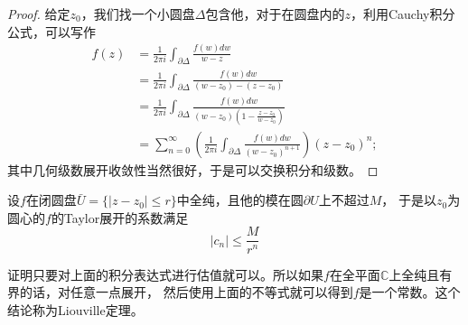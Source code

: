 \begin{proof}
给定$z_0$，我们找一个小圆盘$\Delta$包含他，对于在圆盘内的$z$，利用Cauchy积分公式，可以写作
\[
    \begin{aligned}
        f(z) & =\frac{1}{2 \pi i} \int_{\partial \Delta} \frac{f(w) d w}{w-z} \\
        & =\frac{1}{2 \pi i} \int_{\partial \Delta} \frac{f(w) d w}{\left(w-z_0\right)-\left(z-z_0\right)} \\
        & =\frac{1}{2 \pi i} \int_{\partial \Delta} \frac{f(w) d w}{\left(w-z_0\right)\left(1-\frac{z-z_0}{w-z_0}\right)} \\
        & =\sum_{n=0}^{\infty}\left(\frac{1}{2 \pi i} \int_{\partial \Delta} \frac{f(w) d w}{\left(w-z_0\right)^{n+1}}\right)\left(z-z_0\right)^n ;
    \end{aligned}
\]
其中几何级数展开收敛性当然很好，于是可以交换积分和级数。
\end{proof}

\begin{pro}[Cauchy不等式]
    设$f$在闭圆盘$\bar{U}=\{|z-z_0|\leq r\}$中全纯，且他的模在圆$\partial U$上不超过$M$，
    于是以$z_0$为圆心的$f$的Taylor展开的系数满足
	\[|c_n|\leq \frac{M}{r^n}\]
\end{pro}
证明只要对上面的积分表达式进行估值就可以。所以如果$f$在全平面$\mathbb{C}$上全纯且有界的话，对任意一点展开，
然后使用上面的不等式就可以得到$f$是一个常数。这个结论称为Liouville定理。


